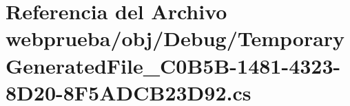 \hypertarget{webprueba_2obj_2_debug_2_temporary_generated_file__036_c0_b5_b-1481-4323-8_d20-8_f5_a_d_c_b23_d92_8cs}{}\section{Referencia del Archivo webprueba/obj/\+Debug/\+Temporary\+Generated\+File\+\_\+C0\+B5\+B-\/1481-\/4323-\/8\+D20-\/8\+F5\+A\+D\+C\+B23\+D92.cs}
\label{webprueba_2obj_2_debug_2_temporary_generated_file__036_c0_b5_b-1481-4323-8_d20-8_f5_a_d_c_b23_d92_8cs}
